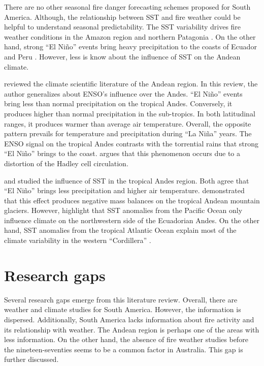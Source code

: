 There are no other seasonal fire danger forecasting schemes proposed
for South America. Although, the relationship between SST and fire
weather could be helpful to understand seasonal predictability. The
SST variability drives fire weather conditions in the Amazon region
and northern Patagonia \citep{Kousky1984,Ropelewski1987,Fernandes2011,Kitzberger2001,Kitzberger2002}.
On the other hand, strong \textquotedblleft El Ni\~no\textquotedblright{}
events bring heavy precipitation to the coasts of Ecuador and Peru
\citep{Rasmusson1982,Horel1986,Rodbell1999}. However, less is know
about the influence of SST on the Andean climate. 

\citet{Garreaud2009} reviewed the climate scientific literature of
the Andean region. In this review, the author generalizes about ENSO's
influence over the Andes. \textquotedblleft El Ni\~no\textquotedblright{}
events bring less than normal precipitation on the tropical Andes.
Conversely, it produces higher than normal precipitation in the sub-tropics.
In both latitudinal ranges, it produces warmer than average air temperature.
Overall, the opposite pattern prevails for temperature and precipitation
during \textquotedblleft La Ni\~na\textquotedblright{} years. The ENSO
signal on the tropical Andes contrasts with the torrential rains that
strong \textquotedblleft El Ni\~no\textquotedblright{} brings to the
coast. \citet{Garreaud2009} argues that this phenomenon occurs due
to a distortion of the Hadley cell circulation. 

\citet{Vuille2000} and \citet{Francou2004} studied the influence
of SST in the tropical Andes region. Both agree that \textquotedblleft El
Ni\~no\textquotedblright{} brings less precipitation and higher air
temperature. \citet{Francou2004} demonstrated that this effect produces
negative mass balances on the tropical Andean mountain glaciers. However,
\citet{Vuille2000} highlight that SST anomalies from the Pacific
Ocean only influence climate on the northwestern side of the Ecuadorian
Andes. On the other hand, SST anomalies from the tropical Atlantic
Ocean explain most of the climate variability in the western \textquotedblleft Cordillera\textquotedblright{}
.


\section{Research gaps}

Several research gaps emerge from this literature review. Overall,
there are weather and climate studies for South America. However,
the information is dispersed. Additionally, South America lacks information
about fire activity and its relationship with weather. The Andean
region is perhaps one of the areas with less information. On the other
hand, the absence of fire weather studies before the nineteen-seventies
seems to be a common factor in Australia. This gap is further discussed.

